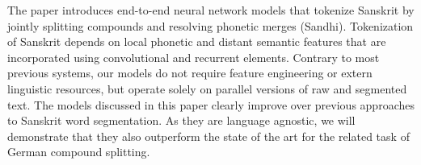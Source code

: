 The paper introduces end-to-end neural network models that tokenize Sanskrit by jointly splitting compounds and resolving phonetic merges (Sandhi). Tokenization of Sanskrit depends on local phonetic and distant semantic features that are incorporated using convolutional and recurrent elements. Contrary to most previous systems, our models do not require feature engineering or extern linguistic resources, but operate solely on parallel versions of raw and segmented text. The models discussed in this paper clearly improve over previous approaches to Sanskrit word segmentation. As they are language agnostic, we will demonstrate that they also outperform the state of the art for the related task of German compound splitting.
